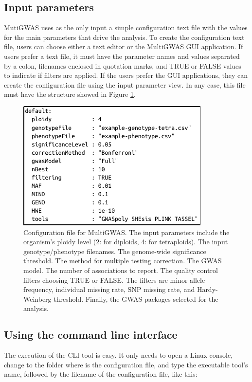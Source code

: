 \documentclass{article}
\begin{document}
\subsection{Input parameters}

MutiGWAS uses as the only input a simple configuration text file with the values for the main parameters that drive the analysis. To create the configuration text file, users can choose either a text editor or the MultiGWAS GUI application.  If users prefer a text file, it must have the parameter names and values separated by a colon, filenames enclosed in quotation marks, and TRUE or FALSE values to indicate if filters are applied. If the users prefer the GUI applications, they can create the configuration file using the input parameter view. In any case, this file must have the structure showed in Figure \ref{fig:Configuration-file}.

\begin{figure}[H]
\begin{centering}
\includegraphics{09_figure-config-file}
\par\end{centering}
\caption{Configuration file for MultiGWAS. The input parameters include the organism's ploidy level (2: for diploids, 4: for tetraploids). The input genotype/phenotype filenames. The genome-wide significance threshold. The method for multiple testing correction. The GWAS model. The number of associations to report. The quality control filters choosing TRUE or FALSE. The filters are minor allele frequency, individual missing rate, SNP missing rate, and Hardy-Weinberg threshold. Finally, the GWAS packages selected for the analysis.
\label{fig:Configuration-file}}
\end{figure}

\subsection{Using the command line interface}
The execution of the CLI tool is easy. It only needs to open a Linux console, change to the folder where is the configuration file, and type the executable tool's name, followed by the filename of the configuration file, like this:
\end{document}
